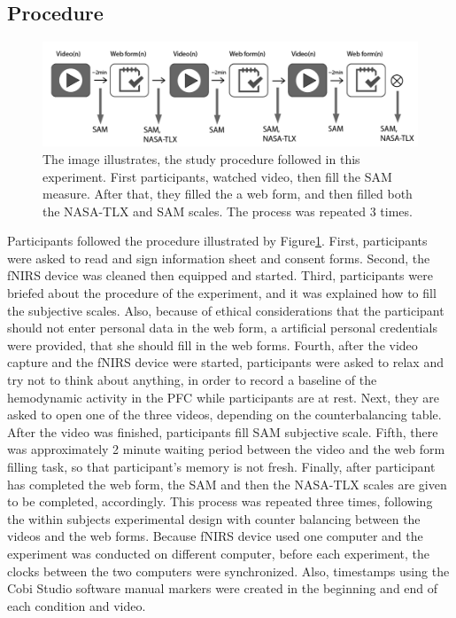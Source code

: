 \documentclass[a4paper]{report}
\begin{document}
		\subsection{Procedure}
		\begin{figure}[h]
			\centering
			\includegraphics[width=0.95\linewidth]{"study-procedure"}
			\caption[study procedure]{The image illustrates, the study procedure followed in this experiment. First participants, watched video, then fill the SAM measure. After that, they filled the a web form, and then filled both the NASA-TLX and SAM scales. The process was repeated 3 times.}
			\label{fig:study-procedure}
		\end{figure}		
		Participants followed the procedure illustrated by Figure\ref{fig:study-procedure}. First, participants were asked to read and sign information sheet and consent forms. Second, the fNIRS device was cleaned then equipped and started. Third, participants were briefed about the procedure of the experiment, and it was explained how to fill the subjective scales. Also, because of ethical considerations that the participant should not enter personal data in the web form, a artificial personal credentials were provided, that she should fill in the web forms. Fourth, after the video capture and the fNIRS device were started, participants were asked to relax and try not to think about anything, in order to record a baseline of the hemodynamic activity in the PFC while participants are at rest. Next, they are asked to open one of the three videos, depending on the counterbalancing table. After the video was finished, participants fill SAM subjective scale. Fifth, there was approximately 2 minute waiting period between the video and the web form filling task, so that participant's memory is not fresh. Finally, after participant has completed the web form, the SAM and then the NASA-TLX scales are given to be completed, accordingly. This process was repeated three times, following the within subjects experimental design with counter balancing between the videos and the web forms. Because fNIRS device used one computer and the experiment was conducted on different computer, before each experiment, the clocks between the two computers were synchronized. Also, timestamps using the Cobi Studio software manual markers were created in the beginning and end of each condition and video. 
\end{document}
